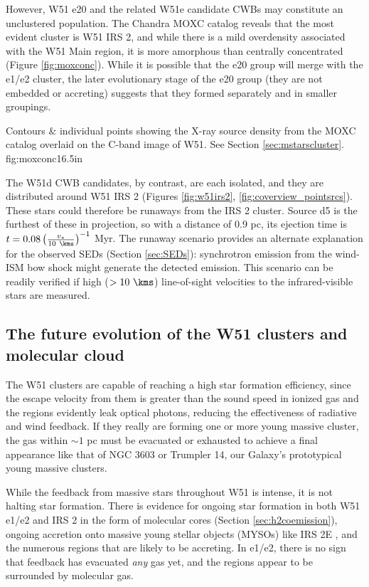 However, W51 e20 and the related W51e candidate CWBs may constitute an
unclustered population.  The Chandra MOXC catalog \citep{Townsley2014a} reveals
that the most evident cluster is W51 IRS 2, and while there is a mild
overdensity associated with the W51 Main region, it is more amorphous than
centrally concentrated (Figure \ref{fig:moxconc}).  While it is possible that
the e20 group will merge with the e1/e2 cluster, the later evolutionary stage
of the e20 group (they are not embedded or accreting) suggests that they formed
separately and in smaller groupings.

{Contours \& individual points showing the X-ray source density from the 
MOXC \citep{Townsley2014a} catalog overlaid on the C-band image of W51.
See Section \ref{sec:mstarscluster}.}
{fig:moxconc}{1}{6.5in}

The W51d CWB candidates, by contrast, are each isolated, and they are
distributed around W51 IRS 2 (Figures \ref{fig:w51irs2},
\ref{fig:coverview_pointsrcs}).  These stars could therefore be runaways from
the IRS 2 cluster.  Source d5 is the furthest of these in projection, so with a
distance of 0.9 pc, its ejection time is $t = 0.08 \left(\frac{v_*}{10
~\kms}\right)^{-1}$ Myr.  The runaway scenario provides an alternate
explanation for the observed SEDs (Section \ref{sec:SEDs}): synchrotron
emission from the wind-ISM bow shock might generate the detected emission.
This scenario can be readily verified if high ($>10~\kms$) line-of-sight
velocities to the infrared-visible stars are measured.


\subsection{The future evolution of the W51 clusters and molecular cloud}
The W51 clusters are capable of reaching a high star formation efficiency,
since the escape velocity from them is greater than the sound speed in ionized gas
\citep{Matzner2002a,Ginsburg2012a,Bressert2012a,Dale2014a} and
the \hii regions evidently leak optical photons, reducing the effectiveness of
radiative and wind feedback.  If they really are
forming one or more
young massive cluster, the gas within $\sim 1$ pc must be evacuated or
exhausted to achieve a final appearance like that of NGC 3603 or Trumpler 14,
our Galaxy's prototypical young massive clusters.


While the feedback from massive stars throughout W51 is intense, it is not
halting star formation.  There is evidence for ongoing star formation in both
W51 e1/e2 and IRS 2 in the form of molecular cores (Section
\ref{sec:h2coemission}), ongoing accretion onto massive young stellar objects
(MYSOs) like IRS 2E \citep{Figueredo2008a}, and the numerous \hchii regions
that are likely to be accreting.  In e1/e2, there is no sign that feedback
has evacuated \emph{any} gas yet, and the \hii regions appear to be surrounded
by molecular gas.

